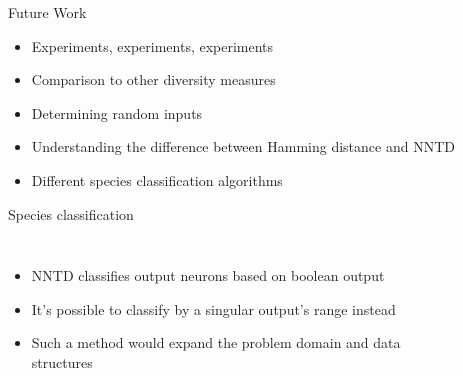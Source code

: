 \begin{frame}{Future Work}
  \begin{itemize}
    \item Experiments, experiments, experiments
    \item Comparison to other diversity measures
    \item Determining random inputs %
    \item Understanding the difference between Hamming distance and NNTD
    \item Different species classification algorithms
  \end{itemize}
\end{frame}

\begin{frame}{Species classification}
  \begin{columns}
    \column{0.5\paperwidth}
    \begin{itemize}
      \item NNTD classifies output neurons based on boolean output
      \item It's possible to classify by a singular output's range instead
      \item Such a method would expand the problem domain and data structures
    \end{itemize}

    \column{0.5\paperwidth}
    \begin{figure}[htbp]
      \centering
      
    \end{figure}
  \end{columns}
\end{frame}
